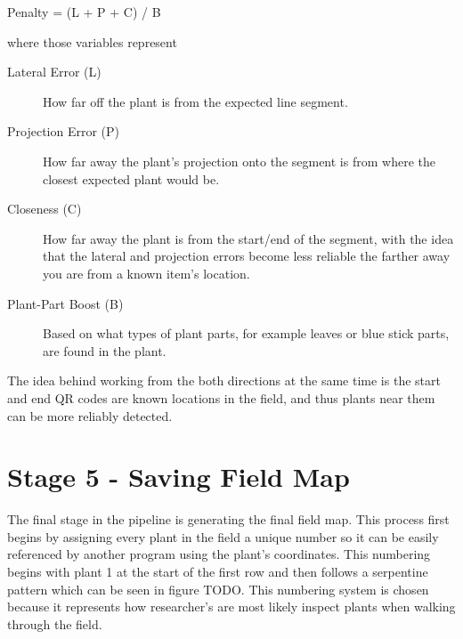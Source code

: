 Penalty = (L + P + C) / B

where those variables represent

\begin{description}
\item[Lateral Error (L)] How far off the plant is from the expected line segment.
\item[Projection Error (P)] How far away the plant's projection onto the segment is from where the closest expected plant would be.
\item[Closeness (C)] How far away the plant is from the start/end of the segment, with the idea that the lateral and projection errors become less reliable the farther away you are from a known item's location.
\item[Plant-Part Boost (B)] Based on what types of plant parts, for example leaves or blue stick parts, are found in the plant.
\end{description}

The idea behind working from the both directions at the same time is the start and end QR codes are known locations in the field, and thus plants near them can be more reliably detected. 

\section{Stage 5 - Saving Field Map}
\label{processing-stage5}

The final stage in the pipeline is generating the final field map.  This process first begins by assigning every plant in the field a unique number so it can be easily referenced by another program using the plant's coordinates.  This numbering begins with plant 1 at the start of the first row and then follows a serpentine pattern which can be seen in figure TODO.  This numbering system is chosen because it represents how researcher's are most likely inspect plants when walking through the field.  